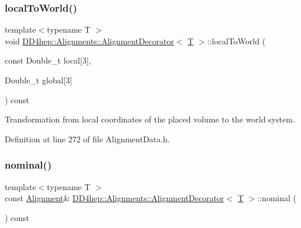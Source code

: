 \subsubsection{\texorpdfstring{local\+To\+World()}{localToWorld()}\hspace{0.1cm}{\footnotesize\ttfamily [3/3]}}
{\footnotesize\ttfamily template$<$typename T $>$ \\
void \hyperlink{class_d_d4hep_1_1_alignments_1_1_alignment_decorator}{D\+D4hep\+::\+Alignments\+::\+Alignment\+Decorator}$<$ \hyperlink{class_t}{T} $>$\+::local\+To\+World (\begin{DoxyParamCaption}\item[{const Double\+\_\+t}]{local\mbox{[}3\mbox{]},  }\item[{Double\+\_\+t}]{global\mbox{[}3\mbox{]} }\end{DoxyParamCaption}) const\hspace{0.3cm}{\ttfamily [inline]}}



Transformation from local coordinates of the placed volume to the world system. 



Definition at line 272 of file Alignment\+Data.\+h.

\hypertarget{class_d_d4hep_1_1_alignments_1_1_alignment_decorator_a1c7bd64cb3ba66fc3c3c91f23f039e6e}{}\label{class_d_d4hep_1_1_alignments_1_1_alignment_decorator_a1c7bd64cb3ba66fc3c3c91f23f039e6e} 
\subsubsection{\texorpdfstring{nominal()}{nominal()}}
{\footnotesize\ttfamily template$<$typename T $>$ \\
const \hyperlink{class_d_d4hep_1_1_alignments_1_1_alignment}{Alignment}\& \hyperlink{class_d_d4hep_1_1_alignments_1_1_alignment_decorator}{D\+D4hep\+::\+Alignments\+::\+Alignment\+Decorator}$<$ \hyperlink{class_t}{T} $>$\+::nominal (\begin{DoxyParamCaption}{ }\end{DoxyParamCaption}) const\hspace{0.3cm}{\ttfamily [inline]}}



